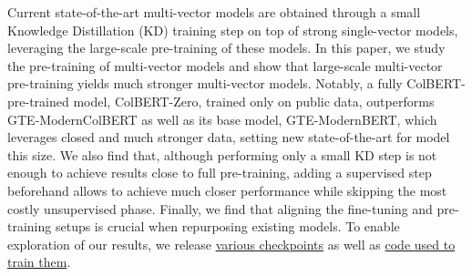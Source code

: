 Current state-of-the-art multi-vector models are obtained through a small Knowledge Distillation (KD) training step on top of strong single-vector models, leveraging the large-scale pre-training of these models. In this paper, we study the pre-training of multi-vector models and show that large-scale multi-vector pre-training yields much stronger multi-vector models. Notably, a fully ColBERT-pre-trained model, ColBERT-Zero, trained only on public data, outperforms GTE-ModernColBERT as well as its base model, GTE-ModernBERT, which leverages closed and much stronger data, setting new state-of-the-art for model this size. We also find that, although performing only a small KD step is not enough to achieve results close to full pre-training, adding a supervised step beforehand allows to achieve much closer performance while skipping the most costly unsupervised phase. Finally, we find that aligning the fine-tuning and pre-training setups is crucial when repurposing existing models. To enable exploration of our results, we release \href{https://huggingface.co/collections/lightonai/colbert-zero}{various checkpoints} as well as \href{https://github.com/lightonai/pylate/tree/main/examples/train/ColBERT-zero/}{code used to train them}.
